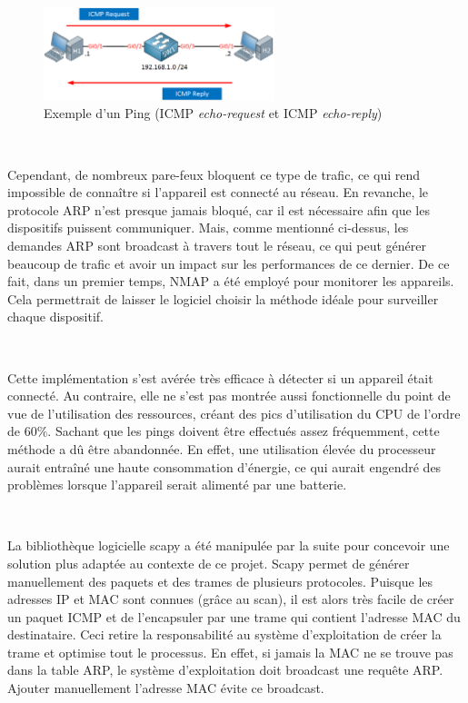 \begin{figure}[ht!]
  \centering
  \includegraphics[width=0.60\textwidth]{img/app/ping.png}
  \caption{Exemple d'un Ping (ICMP \textit{echo-request} et ICMP \textit{echo-reply})}
  \label{fig:icmp}
\end{figure}


~

\noindent
Cependant, de nombreux pare-feux bloquent ce type de trafic, ce qui rend impossible de connaître si l'appareil est connecté au réseau. En revanche, le protocole ARP n’est presque jamais bloqué, car il est nécessaire afin que les dispositifs puissent communiquer. Mais, comme mentionné ci-dessus, les demandes ARP sont broadcast à travers tout le réseau, ce qui peut générer beaucoup de trafic et avoir un impact sur les performances de ce dernier. De ce fait, dans un premier temps, NMAP a été employé pour monitorer les appareils. Cela permettrait de laisser le logiciel choisir la méthode idéale pour surveiller chaque dispositif.

~

\noindent
Cette implémentation s’est avérée très efficace à détecter si un appareil était connecté. Au contraire, elle ne s’est pas montrée aussi fonctionnelle du point de vue de l’utilisation des ressources, créant des pics d'utilisation du CPU de l'ordre de $60\%$. Sachant que les pings doivent être effectués assez fréquemment, cette méthode a dû être abandonnée. En effet, une utilisation élevée du processeur aurait entraîné une haute consommation d'énergie, ce qui aurait engendré des problèmes lorsque l’appareil serait alimenté par une batterie.

~

\noindent
La bibliothèque logicielle scapy a été manipulée par la suite pour concevoir une solution plus adaptée au contexte de ce projet. Scapy permet de générer manuellement des paquets et des trames de plusieurs protocoles. Puisque les adresses IP et MAC sont connues (grâce au scan), il est alors très facile de créer un paquet ICMP et de l’encapsuler par une trame qui contient l’adresse MAC du destinataire. Ceci retire la responsabilité au système d’exploitation de créer la trame et optimise tout le processus. En effet, si jamais la MAC ne se trouve pas dans la table ARP, le système d’exploitation doit broadcast une requête ARP. Ajouter manuellement l’adresse MAC évite ce broadcast.

